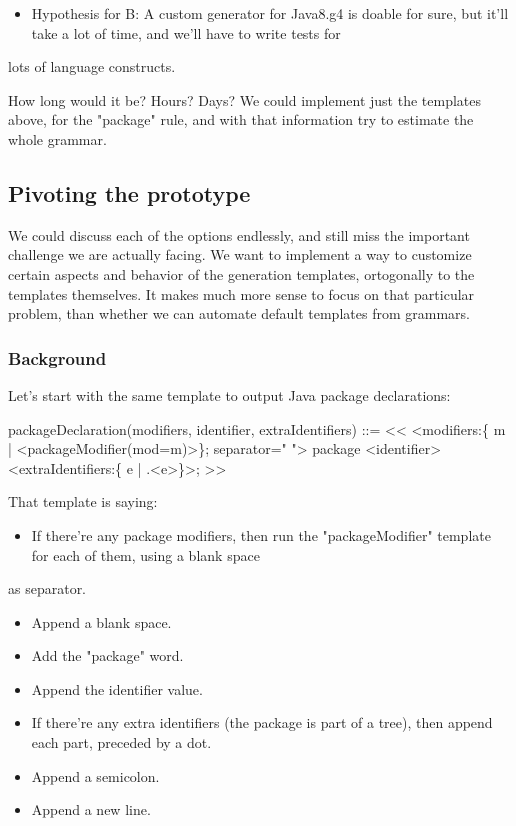 \documentclass[11pt]{article}
\begin{document}
\begin{itemize}
\item Hypothesis for B: A custom generator for Java8.g4 is doable for sure, but it'll take a lot of time, and we'll have to write tests for
\end{itemize}
lots of language constructs.

How long would it be? Hours? Days? We could implement just the templates above, for the "package" rule, and with that information
try to estimate the whole grammar.

\subsection{Pivoting the prototype}
\label{sec-1-4}

We could discuss each of the options endlessly, and still miss the important challenge we are actually facing. We want to implement
a way to customize certain aspects and behavior of the generation templates, ortogonally to the templates themselves. It makes
much more sense to focus on that particular problem, than whether we can automate default templates from grammars.

\subsubsection{Background}
\label{sec-1-4-1}

Let's start with the same template to output Java package declarations:

packageDeclaration(modifiers, identifier, extraIdentifiers) ::= <<
<modifiers:\{ m | <packageModifier(mod=m)>\}; separator=" "> package <identifier><extraIdentifiers:\{ e | .<e>\}>;
>>

That template is saying:
\begin{itemize}
\item If there're any package modifiers, then run the "packageModifier" template for each of them, using a blank space
\end{itemize}
as separator.
\begin{itemize}
\item Append a blank space.
\item Add the "package" word.
\item Append the identifier value.
\item If there're any extra identifiers (the package is part of a tree), then append each part, preceded by a dot.
\item Append a semicolon.
\item Append a new line.
\end{itemize}
\end{document}

